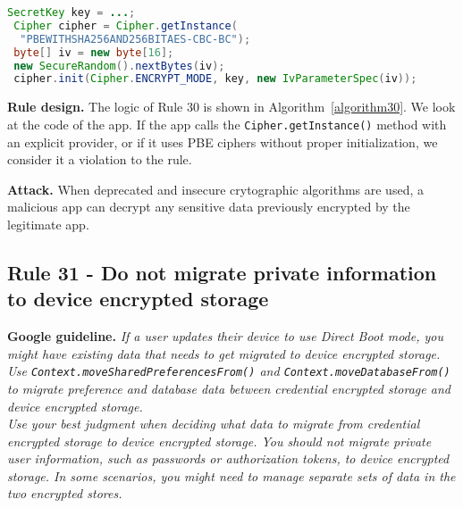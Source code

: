 \begin{lstlisting}[language=Java, caption=Password-based encryption ciphers without an IV, numbers=none]
 SecretKey key = ...;
 Cipher cipher = Cipher.getInstance(
  "PBEWITHSHA256AND256BITAES-CBC-BC");
 byte[] iv = new byte[16];
 new SecureRandom().nextBytes(iv);
 cipher.init(Cipher.ENCRYPT_MODE, key, new IvParameterSpec(iv));

\end{lstlisting}

\textbf{Rule design.} The logic of Rule 30 is shown in Algorithm~\ref{algorithm30}. We look at the code of the app. If the app calls the \texttt{Cipher.getInstance()} method with an explicit provider, or if it uses PBE ciphers without proper initialization, we consider it a violation to the rule. 

\setcounter{algocf}{29}
\begin{algorithm}[]
\SetAlgoLined
{}
\caption{}
\label{algorithm30}
\end{algorithm}

\textbf{Attack.} When deprecated and insecure crytographic algorithms are used, a malicious app can decrypt any sensitive data previously encrypted by the legitimate app. 
\subsection{Rule 31 - Do not migrate private information to device encrypted storage} 
\textbf{Google guideline.} \emph{If a user updates their device to use Direct Boot mode, you might have existing data that needs to get migrated to device encrypted storage. Use \texttt{Context.moveSharedPreferencesFrom()} and \texttt{Context.moveDatabaseFrom()} to migrate preference and database data between credential encrypted storage and device encrypted storage.
\\
Use your best judgment when deciding what data to migrate from credential encrypted storage to device encrypted storage. You should not migrate private user information, such as passwords or authorization tokens, to device encrypted storage. In some scenarios, you might need to manage separate sets of data in the two encrypted stores.}

